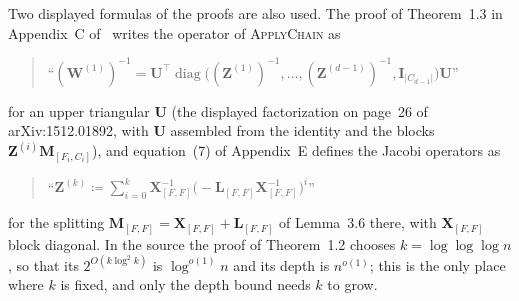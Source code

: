 \documentclass[11pt]{article}
\theoremstyle{remark}
\newcommand{\II}{\mathbf I}
\newcommand{\LL}{\mathbf L}
\newcommand{\MM}{\mathbf M}
\newcommand{\WW}{\mathbf W}
\newcommand{\XX}{\mathbf X}
\newcommand{\UU}{\mathbf U}
\newcommand{\ZZ}{\mathbf Z}
\newcommand{\defeq}{\coloneqq}
\begin{document}
Two displayed formulas of the proofs are also used.
The proof of Theorem~1.3 in Appendix~C of~\cite{KLPSS16:conf} writes the
operator of \textsc{ApplyChain} as
\begin{quote}
``$(\WW^{(1)})^{-1}=\UU^{\top}\operatorname{diag}\bigl((\ZZ^{(1)})^{-1},\dots,
(\ZZ^{(d-1)})^{-1},\II_{|C_{d-1}|}\bigr)\UU$''
\end{quote}
for an upper triangular $\UU$ (the displayed factorization on page~26 of
arXiv:1512.01892, with $\UU$ assembled from the identity and the blocks
$\ZZ^{(i)}\MM_{[F_i,C_i]}$), and equation~(7) of Appendix~E defines the
Jacobi operators as
\begin{quote}
``$\ZZ^{(k)}\defeq\sum_{i=0}^{k}\XX_{[F,F]}^{-1}
\bigl(-\LL_{[F,F]}\XX_{[F,F]}^{-1}\bigr)^{i}$''
\end{quote}
for the splitting $\MM_{[F,F]}=\XX_{[F,F]}+\LL_{[F,F]}$ of Lemma~3.6 there,
with $\XX_{[F,F]}$ block diagonal.
In the source the proof of Theorem~1.2 chooses $k=\log\log\log n$, so that
its $2^{O(k\log^{2}k)}$ is $\log^{o(1)}n$ and its depth is $n^{o(1)}$; this
is the only place where $k$ is fixed, and only the depth bound needs $k$ to
grow.
\end{document}
